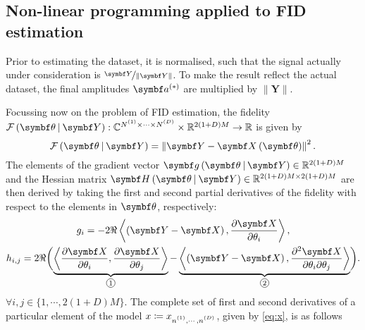 \subsection{Non-linear programming applied to FID estimation}
\begin{remark}
    \label{rem:norm-data}
    Prior to estimating the dataset, it is normalised, such that the signal
    actually under consideration is $\nicefrac{\bY}{\lVert \bY \rVert}$.
    To make the result reflect the actual dataset, the final amplitudes $\bdastar$
    are multiplied by $\lVert \symbf{Y} \rVert$.
\end{remark}
Focussing now on the problem of FID estimation, the fidelity $\FthY
: \mathbb{C}^{\None \times \cdots \times \ND} \times
\mathbb{R}^{2(1 + D)M} \rightarrow \mathbb{R}$ is given by
\begin{equation}
    \FthY = \left \lVert \bY - \bXth \right \rVert^2.
    \label{eq:fidelity}
\end{equation}
The elements of the gradient vector $\bdgthY \in \mathbb{R}^{2(1+D)M}$ and
the Hessian matrix $\bdHthY \in \mathbb{R}^{2(1+D)M \times 2(1+D)M}$ are then
derived by taking the first and second partial derivatives of the fidelity with
respect to the elements in $\bth$, respectively:
\begin{subequations}
    \begin{gather}
        g_i = -2 \Re
                \left\langle
                    \left(\bY - \bX\right),
                    \frac{\partial \bX}{\partial \theta_i}
                \right\rangle,
        \label{eq:grad} \\
        h_{i,j} = 2 \Re
            \biggl(
                \underbrace{
                    \left\langle
                        \frac{\partial \bX}{\partial \theta_i},
                        \frac{\partial \bX}{\partial \theta_j}
                    \right\rangle
                }_{\circled{1}}
                -
                \underbrace{
                    \left\langle
                        \left(\bY - \bX\right),
                        \frac{\partial^2 \bX}{\partial \theta_i \partial \theta_j}
                    \right\rangle
                }_{\circled{2}}
            \biggl).
            \label{eq:hess}
    \end{gather}
    \label{eq:fidelity-grad-hess}
\end{subequations}
$\forall i,j \in \lbrace 1, \cdots, 2(1+D)M \rbrace$.
The complete set of first and second derivatives of a particular element of the
model $x \coloneq \xnonenD$, given by \eqref{eq:x}, is as follows

